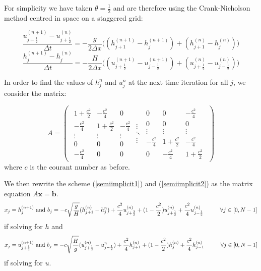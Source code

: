 \documentclass[a4paper,12pt, notitlepage]{article}
\newcommand\tab[1][0.05cm]{\hspace*{#1}}
\begin{document}
For simplicity we have taken $\theta = \frac{1}{2}$ and are therefore using the Crank-Nicholson method centred in space on a staggered grid:

\begin{equation}\label{semiimplicit1}
\frac{u_{j + \frac{1}{2}}^{(n + 1)} - u_{j + \frac{1}{2}}^{(n)}}{\Delta t} = -\frac{g}{2\Delta x} \bigg((h_{j + 1}^{(n+ 1)} - h_{j}^{(n+ 1)}) + (h_{j + 1}^{(n)} - h_{j}^{(n)})\bigg)
\end{equation}
\begin{equation}\label{semiimplicit2}
\frac{h_{j}^{(n + 1)} - h_{j}^{(n)}}{\Delta t} = -\frac{H}{2\Delta x} \bigg((u_{j + \frac{1}{2}}^{(n+ 1)} - u_{j - \frac{1}{2}}^{(n+ 1)}) + (u_{j + \frac{1}{2}}^{(n)} - u_{j - \frac{1}{2}}^{(n)})\bigg)
\end{equation}

In order to find the values of $h_{j}^{n}$ and $u_{j}^{n}$ at the next time iteration for all $j$, we consider the matrix:

\[
A = \left (
\begin{array}{ccc}
\begin{array}{ccc}
1 + \frac{c^{2}}{2} & -\frac{c^{2}}{4} & 0\\
-\frac{c^{2}}{4}& 1 + \frac{c^{2}}{2} & -\frac{c^{2}}{4} \\
\vdots & \vdots & \vdots\\
0 & 0  & 0 \\
- \frac{c^{2}}{4}  & 0  & 0 
\end{array}
\begin{array}{c}
\vdots\\ 
\ddots\\
\vdots
\end{array}
\begin{array}{ccc}
0  & 0  &  - \frac{c^{2}}{4}\\
0  & 0& 0\\
\vdots & \vdots & \vdots\\
-\frac{c^{2}}{4}& 1 + \frac{c^{2}}{2} & -\frac{c^{2}}{4} \\
0 & -\frac{c^{2}}{4} & 1 + \frac{c^{2}}{2}
\end{array}
\end{array}
\right )
\]
where $c$ is the courant number as before. 

We then rewrite the scheme (\ref{semiimplicit1}) and (\ref{semiimplicit2}) as the matrix equation $A \mathbf{x} = \mathbf{b}$.
\begin{equation}
x_{j} = h_{j}^{(n+1)} \text { and } b_{j} = -c\sqrt\frac{g}{H}(h_{j + 1}^{(n)} - h_{j}^{n}) + \frac{c^{2}}{4} u_{j + \frac{3}{2}}^{(n)} + (1 - \frac{c^{2}}{2})u_{j + \frac{1}{2}}^{(n)} + \frac{c^{2}}{4} u_{j - \frac{1}{2}}^{(n)} \tab[1cm] \forall j \in [0, N-1]
\end{equation}
if solving for $h$ and
\begin{equation}
x_{j} = u_{j+ \frac{1}{2}}^{(n+1)} \text { and } b_{j} = -c\sqrt\frac{H}{g}(u_{j + \frac{1}{2}}^{(n)} - u_{j - \frac{1}{2}}^{n}) + \frac{c^{2}}{4} h_{j + 1}^{(n)} + (1 - \frac{c^{2}}{2})h_{j}^{(n)} + \frac{c^{2}}{4} h_{j - 1}^{(n)} \tab[1cm] \forall j \in [0, N-1]
\end{equation}
if solving for $u$.
\end{document}
